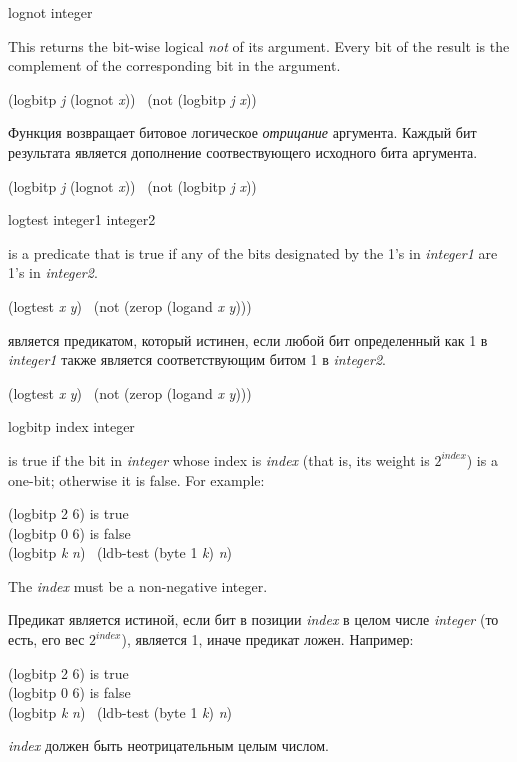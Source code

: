 \begin{defun}[Function]
lognot integer

This returns the bit-wise logical \emph{not} of its argument.
Every bit of the result is the complement of the corresponding bit
in the argument.
\begin{lisp}
(logbitp \emph{j} (lognot \emph{x})) \EQ\ (not (logbitp \emph{j} \emph{x}))
\end{lisp}

Функция возвращает битовое логическое \emph{отрицание} аргумента.
Каждый бит результата является дополнение соотвествующего исходного бита
аргумента.
\begin{lisp}
(logbitp \emph{j} (lognot \emph{x})) \EQ\ (not (logbitp \emph{j} \emph{x}))
\end{lisp}
\end{defun}

\begin{defun}[Function]
logtest integer1 integer2

 is a predicate that is true if any of
the bits designated by the 1's in \emph{integer1} are 1's in \emph{integer2}.
\begin{lisp}
(logtest \emph{x} \emph{y}) \EQ\ (not (zerop (logand \emph{x} \emph{y})))
\end{lisp}

 является предикатом, который истинен, если любой бит определенный
как 1 в \emph{integer1} также является соответствующим битом 1 в
\emph{integer2}.
\begin{lisp}
(logtest \emph{x} \emph{y}) \EQ\ (not (zerop (logand \emph{x} \emph{y})))
\end{lisp}
\end{defun}

\begin{defun}[Function]
logbitp index integer

 is true if the bit in \emph{integer} whose index
is \emph{index} (that is, its weight is $2^{index}$) is a one-bit;
otherwise it is false.
For example:
\begin{lisp}
(logbitp 2 6) \textrm{is true} \\
(logbitp 0 6) \textrm{is false} \\
(logbitp \emph{k} \emph{n}) \EQ\ (ldb-test (byte 1 \emph{k}) \emph{n})
\end{lisp}

The \emph{index} must be a non-negative integer.

Предикат  является истиной, если бит в позиции \emph{index} в целом
числе \emph{integer} (то есть, его вес $2^{index}$), является 1, иначе предикат
ложен.
Например:
\begin{lisp}
(logbitp 2 6) \textrm{is true} \\
(logbitp 0 6) \textrm{is false} \\
(logbitp \emph{k} \emph{n}) \EQ\ (ldb-test (byte 1 \emph{k}) \emph{n})
\end{lisp}

\emph{index} должен быть неотрицательным целым числом.
\end{defun}

